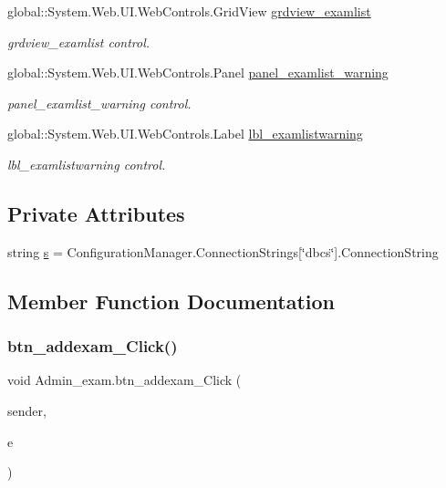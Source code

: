 \begin{DoxyCompactItemize}
global\+::\+System.\+Web.\+U\+I.\+Web\+Controls.\+Grid\+View \mbox{\hyperlink{class_admin__exam_ae74df5782c8358a82a959aac2ef67e90}{grdview\+\_\+examlist}}
\begin{DoxyCompactList}\small\item\em grdview\+\_\+examlist control. \end{DoxyCompactList}\item 
global\+::\+System.\+Web.\+U\+I.\+Web\+Controls.\+Panel \mbox{\hyperlink{class_admin__exam_a7a6862e10b7bbacd8ffb44570bc4e7f4}{panel\+\_\+examlist\+\_\+warning}}
\begin{DoxyCompactList}\small\item\em panel\+\_\+examlist\+\_\+warning control. \end{DoxyCompactList}\item 
global\+::\+System.\+Web.\+U\+I.\+Web\+Controls.\+Label \mbox{\hyperlink{class_admin__exam_af4a42ee8bbc70b7538a3c053df9896d6}{lbl\+\_\+examlistwarning}}
\begin{DoxyCompactList}\small\item\em lbl\+\_\+examlistwarning control. \end{DoxyCompactList}\end{DoxyCompactItemize}
\subsection*{Private Attributes}
\begin{DoxyCompactItemize}
\item 
string \mbox{\hyperlink{class_admin__exam_aa2e22318060149512c85d2350657f1f4}{s}} = Configuration\+Manager.\+Connection\+Strings\mbox{[}\char`\"{}dbcs\char`\"{}\mbox{]}.Connection\+String
\end{DoxyCompactItemize}


\subsection{Member Function Documentation}
\mbox{\label{class_admin__exam_addecc67ff48bdc0aa12b62d9957507e3}} 
\subsubsection{\texorpdfstring{btn\_addexam\_Click()}{btn\_addexam\_Click()}}
{\footnotesize\ttfamily void Admin\+\_\+exam.\+btn\+\_\+addexam\+\_\+\+Click (\begin{DoxyParamCaption}\item[{object}]{sender,  }\item[{Event\+Args}]{e }\end{DoxyParamCaption})\hspace{0.3cm}{\ttfamily [protected]}}

